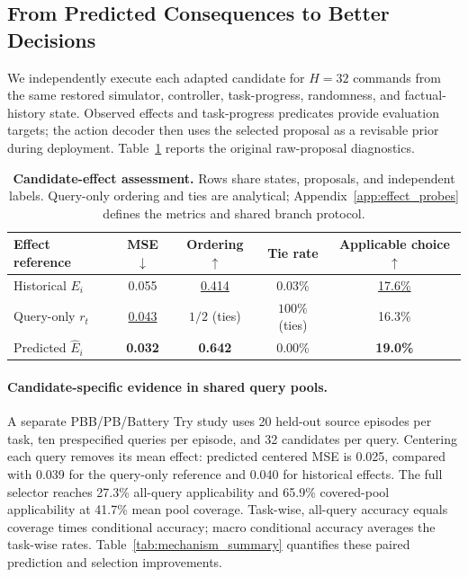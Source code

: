 \subsection{From Predicted Consequences to Better Decisions}
\label{sec:candidate_results}
We independently execute each adapted candidate for $H=32$ commands from the same restored simulator, controller, task-progress, randomness, and factual-history state.
Observed effects and task-progress predicates provide evaluation targets; the action decoder then uses the selected proposal as a revisable prior during deployment.
Table~\ref{tab:effect_probes} reports the original raw-proposal diagnostics.

\begin{table}[!ht]
\centering\small
\caption{\textbf{Candidate-effect assessment.} Rows share states, proposals, and independent labels. Query-only ordering and ties are analytical; Appendix~\ref{app:effect_probes} defines the metrics and shared branch protocol.}
\label{tab:effect_probes}
\begin{tabularx}{\linewidth}{@{}Xcccc@{}}
\toprule
Effect reference & MSE $\downarrow$ & Ordering $\uparrow$ & Tie rate & Applicable choice $\uparrow$ \\
\midrule
Historical $E_i$ & 0.055 & \underline{0.414} & {0.03\%} & {\underline{17.6\%}} \\
Query-only $r_t$ & {\underline{0.043}} & $1/2$ (ties) & $100\%$ (ties) & {16.3\%} \\
Predicted $\widehat E_i$ & {\textbf{0.032}} & {\textbf{0.642}} & {0.00\%} & {\textbf{19.0\%}} \\
\bottomrule
\end{tabularx}
\end{table}
\paragraph{Candidate-specific evidence in shared query pools.}
A separate PBB/PB/Battery Try study uses 20 held-out source episodes per task, ten prespecified queries per episode, and 32 candidates per query.
Centering each query removes its mean effect: predicted centered MSE is 0.025, compared with 0.039 for the query-only reference and 0.040 for historical effects.
The full selector reaches 27.3\% all-query applicability and 65.9\% covered-pool applicability at 41.7\% mean pool coverage.
Task-wise, all-query accuracy equals coverage times conditional accuracy; macro conditional accuracy averages the task-wise rates.
Table~\ref{tab:mechanism_summary} quantifies these paired prediction and selection improvements.

